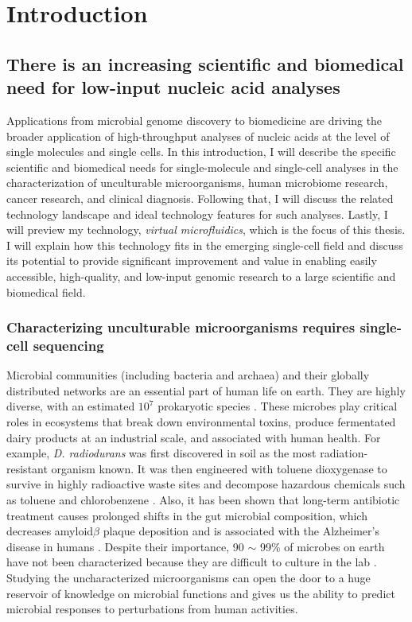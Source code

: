 \chapter{Introduction}
\section{There is an increasing scientific and biomedical need for low-input nucleic acid analyses}

Applications from microbial genome discovery to biomedicine\cite{Blainey:2013hn,Marshall:2012jz,Wang:2012bb,Huggett:2015hp,Evrony:2016du,Evrony:2012dl,Rinke:2013bt,Navin:2011jq} are driving the broader application of high-throughput analyses of nucleic acids at the level of single molecules and single cells. In this introduction, I will describe the specific scientific and biomedical needs for single-molecule and single-cell analyses in the characterization of unculturable microorganisms, human microbiome research, cancer research, and clinical diagnosis. Following that, I will discuss the related technology landscape and ideal technology features for such analyses. Lastly, I will preview my technology, \textit{virtual microfluidics}, which is the focus of this thesis. I will explain how this technology fits in the emerging single-cell field and discuss its potential to provide significant improvement and value in enabling easily accessible, high-quality, and low-input genomic research to a large scientific and biomedical field. 

\subsection{Characterizing unculturable microorganisms requires single-cell sequencing}

Microbial communities (including bacteria and archaea) and their globally distributed networks are an essential part of human life on earth. They are highly diverse, with an estimated $10^{7}$ prokaryotic species \cite{Curtis:2002dj}. These microbes play critical roles in ecosystems that break down environmental toxins, produce fermentated dairy products at an industrial scale, and associated with human health. For example, \textit{D. radiodurans} was first discovered in soil as the most radiation-resistant organism known. It was then engineered with toluene dioxygenase to survive in highly radioactive waste sites and decompose hazardous chemicals such as toluene and chlorobenzene \cite{Lange:1998ea}. Also, it has been shown that long-term antibiotic treatment causes prolonged shifts in the gut microbial composition, which decreases amyloid$\beta$ plaque deposition and is associated with the Alzheimer's disease in humans \cite{Minter:2016ga}. Despite their importance, 90 $\sim$ 99\% of microbes on earth have not been characterized because they are difficult to culture in the lab \cite{Yilmaz:2011bc}. Studying the uncharacterized microorganisms can open the door to a huge reservoir of knowledge on microbial functions and gives us the ability to predict microbial responses to perturbations from human activities.  

